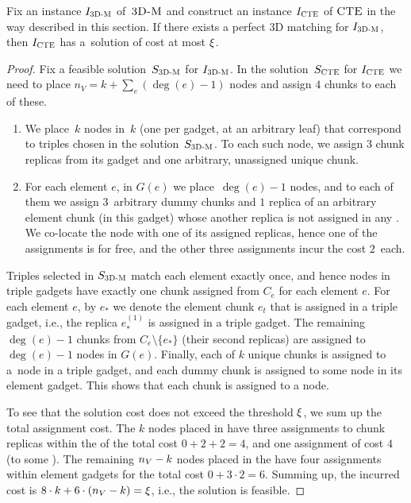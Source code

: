 \begin{lemma}
  Fix an instance $I_{\mathrm{\textsc{3D-M}}}$ of~$\textsc{3D-M}$ and construct an instance $I_{\mathrm{\textsc{CTE}}}$ of $\textsc{CTE}$ in the way described in this section.
  If there exists a perfect 3D matching for $I_{\mathrm{\textsc{3D-M}}}$, then $I_{\mathrm{\textsc{CTE}}}$ has a~solution of cost at most $\xi$.
    \label{lem:ma-reduction-left}
\end{lemma}
\begin{proof}
  Fix a feasible solution~$S_{\mathrm{\textsc{3D-M}}}$ for $I_{\mathrm{\textsc{3D-M}}}$. In the solution~$S_{\mathrm{\textsc{CTE}}}$ for $I_{\mathrm{\textsc{CTE}}}$ we need to place $n_V = k + \sum_e(\deg(e) - 1)$ nodes and assign $4$ chunks to each of these.
  \begin{enumerate}
    \item We place~$k$ nodes in~$k$ {\TripleGadgets} (one per gadget, at an arbitrary leaf) that correspond to triples chosen in the solution~$S_{\mathrm{\textsc{3D-M}}}$.
    To each such node, we assign $3$ chunk replicas from its gadget and one arbitrary, unassigned unique chunk.
    \item For each element $e$, in $G(e)$ we place~$\deg(e) - 1$ nodes, and to each of them we assign $3$~arbitrary dummy chunks and $1$ replica of an arbitrary 
    element chunk (in this
    gadget) whose another replica is not assigned in any {\TripleGadget}.
    We co-locate the node with one of its assigned replicas, hence one of the assignments is for free, and the other three assignments incur the cost $2$~each.
  \end{enumerate}
  Triples selected in $S_{\mathrm{\textsc{3D-M}}}$ match each element exactly once,
  and hence nodes in triple gadgets have exactly one chunk assigned from $C_e$ for each element $e$.
  For each element $e$, by $e_*$ we denote the element chunk $e_t$ that is assigned in a triple gadget, i.e., the replica $e_*^{(1)}$ is assigned in a triple gadget.
  The remaining $\deg(e)-1$ chunks from $C_e \setminus \{ e_* \}$ (their second replicas) are assigned to $\deg(e)-1$ nodes in $G(e)$.
  Finally, each of $k$ unique chunks is assigned to a~node in a triple gadget, and each dummy chunk is assigned to some node in its element gadget.
  This shows that each chunk is assigned to a node.
  
  To see that the solution cost does not exceed the threshold $\xi$, we sum up the total assignment cost.
  The $k$ nodes placed in \TripleGadgets{} have three assignments to chunk replicas within the \TripleGadget{} of the total cost $0+2+2=4$, and one assignment of cost $4$ (to some \UnqGadget{}).
  The remaining $n_V-k$ nodes placed in the \CoverSubtree{} have four assignments within element gadgets for the total cost $0+3\cdot 2 = 6$.
  Summing up, the incurred cost is $8\cdot k + 6\cdot (n_V - k) = \xi$, i.e., the solution is feasible.
\end{proof}


